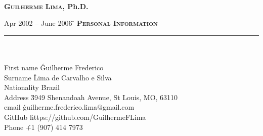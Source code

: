 \documentclass[11pt,a4paper]{article}
\begin{document}
\makeatletter
 \renewcommand{\@evenhead}{\textit{Guilherme Lima CV continued...}\hfil}
 \renewcommand{\@oddhead}{\@evenhead}
 \renewcommand{\@evenfoot}{\hfil \thepage\ of\  \pageref{LastPage}\hfil}
 \renewcommand{\@oddfoot}{\@evenfoot}
\makeatother



\thispagestyle{empty}
\begin{center}
{\huge\textbf{\textsc{\\ Guilherme Lima}, Ph.D.}} \\ \vspace{0.5cm}
\vspace{1.0cm}
\end{center}
\begin{tabbing} 
Apr 2002 -- June 2006 \=\kill
\> \textbf{\Large{\textsc{Personal Information}}}\\
\> \noindent\rule{11cm}{1pt}\\
\\
\> First name \' Guilherme Frederico \\
\> Surname \' Lima de Carvalho e Silva \\
\> Nationality \' Brazil \\
\> Address  \' 3949 Shenandoah Avenue, St Louis, MO, 63110 \\
\> email \' guilherme.frederico.lima@gmail.com \\
\> GitHub \' https://github.com/GuilhermeFLima \\
\> Phone  \' +1 (907) 414 7973 \\
\end{tabbing}



\end{document}
